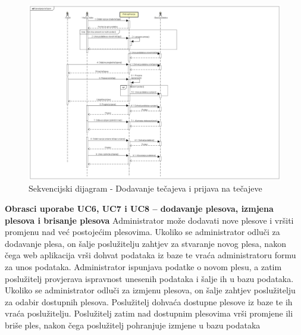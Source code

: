 		\begin{figure}[H]
			\includegraphics[scale=0.4]{slike/SD-Upravljanje tečajem.PNG} %
			\centering
			\caption{Sekvencijski dijagram - Dodavanje tečajeva i prijava na tečajeve}
			\label{fig:tecaj}
		\end{figure}

				\noindent \textbf {Obrasci uporabe UC6, UC7 i UC8 – dodavanje plesova, izmjena plesova i brisanje plesova }
Administrator može dodavati nove plesove i vršiti promjenu nad već postojećim plesovima. Ukoliko se administrator odluči za dodavanje plesa, on šalje poslužitelju zahtjev za stvaranje novog plesa, nakon čega web aplikacija vrši dohvat podataka iz baze te vraća administratoru formu za unos podataka. Administrator ispunjava podatke o novom plesu, a zatim poslužitelj provjerava ispravnost unesenih podataka i šalje ih u bazu podataka. Ukoliko se administrator odluči za izmjenu plesova, on šalje zahtjev poslužitelju za odabir dostupnih plesova. Poslužitelj dohvaća dostupne plesove iz baze te ih vraća poslužitelju. Poslužitelj zatim nad dostupnim plesovima vrši promjene ili briše ples, nakon čega poslužitelj pohranjuje izmjene u bazu podataka
		
